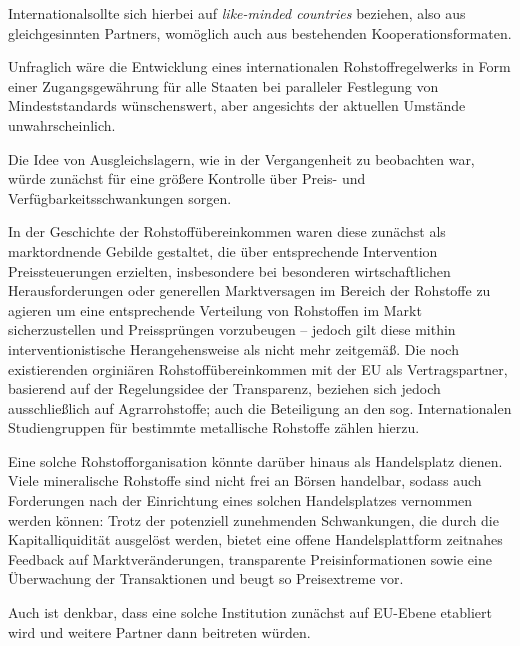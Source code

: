 \documentclass[12pt,a4paper,oneside]{book} %
\begin{document}
{\glqq International\grqq sollte sich hierbei auf \textit{like-minded countries} beziehen, also aus gleichgesinnten Partners, womöglich auch aus bestehenden Kooperationsformaten.

Unfraglich wäre die Entwicklung eines internationalen Rohstoffregelwerks in Form einer Zugangsgewährung für alle Staaten bei paralleler Festlegung von Mindeststandards wünschenswert,\autocite{Frenz 2025, S. 1035} aber angesichts der aktuellen Umstände unwahrscheinlich.

Die Idee von Ausgleichslagern, wie in der Vergangenheit zu beobachten war, würde zunächst für eine größere Kontrolle über Preis- und Verfügbarkeitsschwankungen sorgen.

In der Geschichte der Rohstoffübereinkommen waren diese zunächst als marktordnende Gebilde gestaltet, die über entsprechende Intervention Preissteuerungen erzielten, insbesondere bei besonderen wirtschaftlichen Herausforderungen oder generellen Marktversagen im Bereich der Rohstoffe zu agieren um eine entsprechende Verteilung von Rohstoffen im Markt sicherzustellen und Preissprüngen vorzubeugen -- jedoch gilt diese mithin interventionistische Herangehensweise als nicht mehr zeitgemäß.\autocite[Und dazu auch widerlegt; siehe ausführlich]{Schorkopf, Rn. 43} Die noch existierenden orginiären Rohstoffübereinkommen mit der EU als Vertragspartner, basierend auf der Regelungsidee der Transparenz, beziehen sich jedoch ausschließlich auf Agrarrohstoffe; auch die Beteiligung an den sog. Internationalen Studiengruppen für bestimmte metallische Rohstoffe zählen hierzu.\autocite{Schorkopf, Rn. 44, 45}

Eine solche Rohstofforganisation könnte darüber hinaus als Handelsplatz dienen. Viele mineralische Rohstoffe sind nicht frei an Börsen handelbar, sodass auch Forderungen nach der Einrichtung eines solchen Handelsplatzes vernommen werden können: Trotz der potenziell zunehmenden Schwankungen, die durch die Kapitalliquidität ausgelöst werden, bietet eine offene Handelsplattform zeitnahes Feedback auf Marktveränderungen, transparente Preisinformationen sowie eine Überwachung der Transaktionen und beugt so Preisextreme vor.\autocite{Surging lithium price will not impede the electric vehicle boombid}

Auch ist denkbar, dass eine solche Institution zunächst auf EU-Ebene etabliert wird und weitere Partner dann beitreten würden.

}
\end{document}
